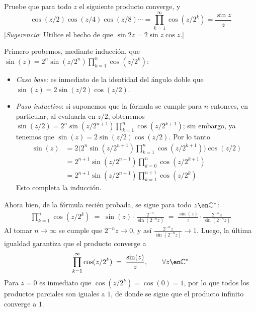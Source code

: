 \setcounter{eje}{7}
\begin{ejer}
Pruebe que para todo $z$ el siguiente producto converge, y
\[ \cos(z/2)\cos(z/4)\cos(z/8)\cdots = \prod_{k=1}^{\infty} \cos(z/2^k) = \frac{\sin z}{z} \]
[\textit{Sugerencia}: Utilice el hecho de que $\sin 2z = 2\sin z \cos z$.]
\end{ejer}
\begin{sol}
Primero probemos, mediante inducción, que $\sin(z) = 2^n\sin(z/2^n)\prod^n_{k=1}\cos(z/2^k)$:
\begin{itemize}[leftmargin=1em]
\item \emph{Caso base}: es inmediato de la identidad del ángulo doble que $\sin(z) = 2\sin(z/2)\cos(z/2)
$.
\item \emph{Paso inductivo}: si suponemos que la fórmula se cumple para $n$ entonces, en particular, al evaluarla en $z/2$, obtenemos $\sin(z/2) = 2^n\sin(z/2^{n+1})\prod^n_{k=1}\cos(z/2^{k+1})$; sin embargo, ya tenemos que $\sin(z) = 2\sin(z/2)\cos(z/2)$. Por lo tanto
\begin{align*}
\sin(z) 
&= 2\bigg(2^n\sin(z/2^{n+1})\prod^n_{k=1}\cos(z/2^{k+1})\bigg)\cos(z/2)\\
&=2^{n+1}\sin(z/2^{n+1})\prod^n_{k=0}\cos(z/2^{k+1})\\    
&=2^{n+1}\sin(z/2^{n+1})\prod^{n+1}_{k=1}\cos(z/2^{k})   
\end{align*}
Esto completa la inducción.
\end{itemize}
Ahora bien, de la fórmula recién probada, se sigue para todo $z\en\mathbb{C}^*$:
\begin{align*}
\prod^{n}_{k=1}\cos(z/2^k) 
\;=\; \sin(z) \cdot \frac{2^{-n}}{\sin(2^{-n}z)}
\;=\; \frac{\sin(z)}{z} \cdot \frac{2^{-n}z}{\sin(2^{-n}z)}
\end{align*}
Al tomar $n\to\infty$ se cumple que $2^{-n}z \to 0$, y así $\frac{2^{-n}z}{\sin(2^{-n}z)} \to 1$. Luego, la última igualdad garantiza que el producto converge a
\[
\prod^{\infty}_{k=1}\cos(z/2^k) 
\;=\; \frac{\sin(z)}{z},
\qquad\forall z \en \mathbb{C}^*
\]
Para $z=0$ es inmediato que $\cos(z/2^k) = \cos(0) = 1$, por lo que todos los productos parciales son iguales a $1$, de donde se sigue que el producto infinito converge a $1$.
\end{sol}
